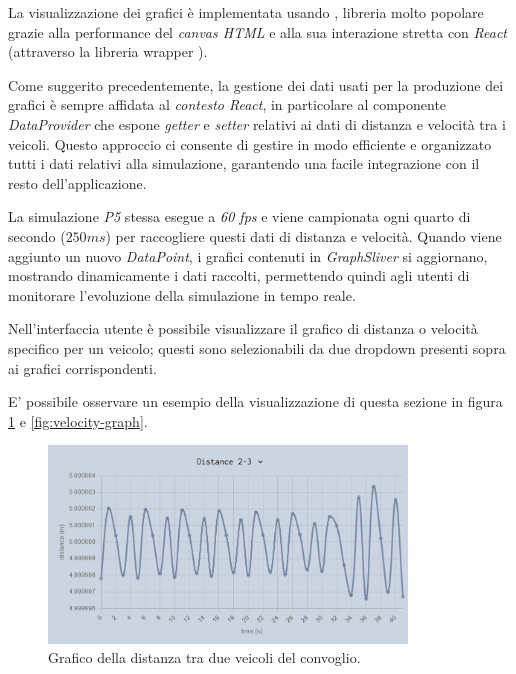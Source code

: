 La visualizzazione dei grafici è implementata usando , libreria molto popolare grazie alla performance del \textit{canvas HTML} e alla sua interazione stretta con \textit{React} (attraverso la libreria wrapper ).

Come suggerito precedentemente, la gestione dei dati usati per la produzione dei grafici è sempre affidata al \textit{contesto React}, in particolare al componente \textit{DataProvider} che espone \textit{getter} e \textit{setter} relativi ai dati di distanza e velocità tra i veicoli. Questo approccio ci consente di gestire in modo efficiente e organizzato tutti i dati relativi alla simulazione, garantendo una facile integrazione con il resto dell'applicazione.

La simulazione \textit{P5} stessa esegue a \textit{60 fps} e viene campionata ogni quarto di secondo ($250ms$) per raccogliere questi dati di distanza e velocità. Quando viene aggiunto un nuovo \textit{DataPoint}, i grafici contenuti in \textit{GraphSliver} si aggiornano, mostrando dinamicamente i dati raccolti, permettendo quindi agli utenti di monitorare l'evoluzione della simulazione in tempo reale. 

Nell'interfaccia utente è possibile visualizzare il grafico di distanza o velocità specifico per un veicolo; questi sono selezionabili da due dropdown presenti sopra ai grafici corrispondenti. 

E' possibile osservare un esempio della visualizzazione di questa sezione in figura \ref{fig:distance-graph} e \ref{fig:velocity-graph}.

\begin{figure}[H]
    \vspace{1em}
    \centering
    \includegraphics[width=0.85\textwidth, keepaspectratio]{images/4-frontend/distance-graph.png}
    \caption{Grafico della distanza tra due veicoli del convoglio.}
    \label{fig:distance-graph}
\end{figure}

